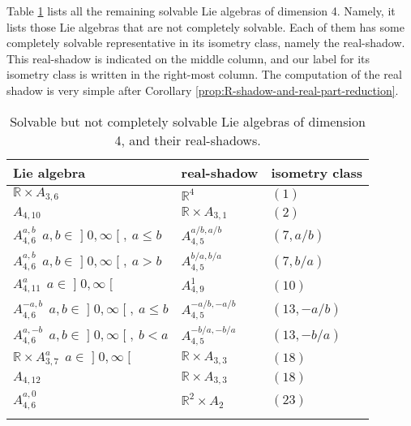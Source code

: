 \documentclass[a4paper,12pt]{amsart}
\newcommand{\vali}[1]{\mathopen{]} #1 \mathclose{[}}
\theoremstyle{plain}
\theoremstyle{definition}
\theoremstyle{plain}
\theoremstyle{remark}
\newcommand\YT{\rule{0pt}{2.6ex}}       %
\newcommand\AT{\rule[-1.2ex]{0pt}{0pt}} %
\begin{document}
Table \ref{4D-luokittelu-complex} lists all the remaining solvable Lie algebras of dimension 4. Namely, it lists those Lie algebras that are not completely solvable. Each of them has some completely solvable representative in its isometry class, namely the real-shadow. This real-shadow is indicated on the middle column, and our label for its isometry class is written in the right-most column. The computation of the real shadow is very simple after Corollary \ref{prop:R-shadow-and-real-part-reduction}. 


\begin{table}[htb]
	\begin{tabular}{lll}
		\textbf{Lie algebra} & \textbf{real-shadow} & \textbf{isometry class}
		\\
		\hline
		\( \mathbb{R} \times A_{3,6} \) & \(\mathbb{R}^4\)  & \((1)\) \AT \YT
		\\ \hline
		\( A_{4,10} \) & \( \mathbb{R} \times A_{3,1} \) &  \( (2)\) \AT \YT
		\\ \hline
		\( A_{4,6}^{a,b} \:\: a,b \in \vali{0,\infty},\: a \le b \) & \( A_{4,5}^{a/b,a/b} \) & \( (7,a/b) \) \AT \YT
		\\ \hline
		\( A_{4,6}^{a,b} \:\: a,b \in \vali{0,\infty},\: a > b \) & \( A_{4,5}^{b/a,b/a} \) & \( (7,b/a) \) \AT \YT
		\\ \hline
		\( A_{4,11}^{a} \:\: a \in \vali{0,\infty} \) & \( A_{4,9}^1 \)  &  \( (10) \) \AT \YT
		\\ \hline
		\( A_{4,6}^{-a,b} \:\: a,b \in \vali{0,\infty},\: a\le b \) & \( A_{4,5}^{-a/b,-a/b} \) & \( (13,-a/b) \) \AT \YT
		\\ \hline
		\( A_{4,6}^{a,-b} \:\: a,b \in \vali{0,\infty},\: b < a  \) & \( A_{4,5}^{-b/a,-b/a} \) & \( (13,-b/a) \) \AT \YT
		\\ \hline
		\( \mathbb{R} \times A_{3,7}^a \:\:  a \in \vali{0,\infty} \)  & \(\mathbb{R} \times A_{3,3} \) & \((18)\)\AT \YT
		\\ \hline
		\( A_{4,12} \)  & \(\mathbb{R} \times A_{3,3} \) & \((18)\)\AT \YT
		\\ \hline
		\( A_{4,6}^{a,0} \)  & \(\mathbb{R}^2 \times  A_2\)  & \( (23) \) \AT \YT
		\\ \hline \\
	\end{tabular}
	\caption{Solvable but not completely solvable Lie algebras of dimension 4, and their real-shadows.}
	\label{4D-luokittelu-complex} 
\end{table}
\end{document}
